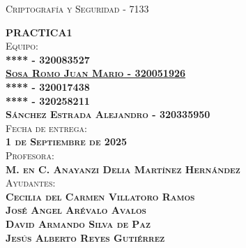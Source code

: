 \begin{titlepage}
\begin{minipage}[c][0.81\textheight][t]{0.75\textwidth}
\begin{center}
			{\large\scshape Criptografía y Seguridad - 7133}\\[.2in]
			
			\vspace{2cm}            
			
			\textsc{\LARGE \textbf{P}\hspace{1cm}\textbf{R}\hspace{1cm}\textbf{A}\hspace{1cm}\textbf{C}\hspace{1cm}\textbf{T}\hspace{1cm}\textbf{I}\hspace{1cm}\textbf{C}\hspace{1cm}\textbf{A}\hspace{1.3cm}\textbf{1}}\\[2cm]
			\textsc{\Large{Equipo:}\normalsize \\
                \vspace{.3cm}
				\textbf{**** - 320083527 \\
                \vspace{.2cm}
				\href{https://github.com/JuanSosaCiencias}{{Sosa Romo Juan Mario - 320051926}} \\
                \vspace{.2cm}
				**** - 320017438 \\
                \vspace{.2cm}
                **** - 320258211 \\
                \vspace{.2cm}
                Sánchez Estrada Alejandro - 320335950}}\\[0.5cm]     
			
			\textsc{{Fecha de entrega: \\ \textbf{1 de Septiembre de 2025}}}\\[0.5cm]        
			
			\textsc{{Profesora: \\ \textbf{M. en C. Anayanzi Delia Martínez Hernández}}}\\[0.5cm]  
			
			\textsc{Ayudantes: \\ \textbf{Cecilia del Carmen Villatoro Ramos \\ José Angel Arévalo Avalos \\ David Armando Silva de Paz \\ Jesús Alberto Reyes Gutiérrez
			} }
			
			
			\vspace{0.5cm}
		\end{center}
	\end{minipage}
\end{titlepage}
